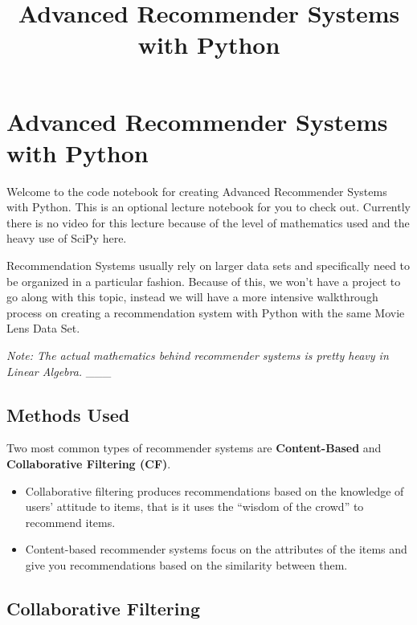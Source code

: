 \documentclass[11pt]{article}
\title{Advanced Recommender Systems with Python}
\providecommand{\tightlist}{%
      \setlength{\itemsep}{0pt}\setlength{\parskip}{0pt}}
\begin{document}
    
    
    \maketitle
    
    

    
    \hypertarget{advanced-recommender-systems-with-python}{%
\section{Advanced Recommender Systems with
Python}\label{advanced-recommender-systems-with-python}}

Welcome to the code notebook for creating Advanced Recommender Systems
with Python. This is an optional lecture notebook for you to check out.
Currently there is no video for this lecture because of the level of
mathematics used and the heavy use of SciPy here.

Recommendation Systems usually rely on larger data sets and specifically
need to be organized in a particular fashion. Because of this, we won't
have a project to go along with this topic, instead we will have a more
intensive walkthrough process on creating a recommendation system with
Python with the same Movie Lens Data Set.

\emph{Note: The actual mathematics behind recommender systems is pretty
heavy in Linear Algebra.} \_\_\_

    \hypertarget{methods-used}{%
\subsection{Methods Used}\label{methods-used}}

Two most common types of recommender systems are \textbf{Content-Based}
and \textbf{Collaborative Filtering (CF)}.

\begin{itemize}
\tightlist
\item
  Collaborative filtering produces recommendations based on the
  knowledge of users' attitude to items, that is it uses the ``wisdom of
  the crowd'' to recommend items.
\item
  Content-based recommender systems focus on the attributes of the items
  and give you recommendations based on the similarity between them.
\end{itemize}

\hypertarget{collaborative-filtering}{%
\subsection{Collaborative Filtering}\label{collaborative-filtering}}
\end{document}
